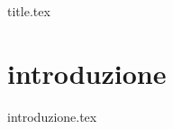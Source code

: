 \documentclass[a4paper,11pt,oneside]{book}
\begin{document}

\frontmatter

{title.tex}

\tableofcontents

\mainmatter



\chapter{introduzione}
{introduzione.tex}


\cleardoublepage
\end{document}
